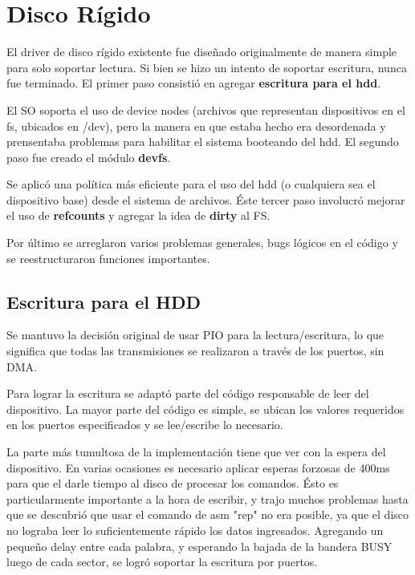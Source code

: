 \section{Disco Rígido}

El driver de disco rígido existente fue diseñado originalmente
de manera simple para solo soportar lectura. Si bien se hizo un intento de
soportar escritura, nunca fue terminado. El primer paso consistió en
agregar \textbf{escritura para el hdd}.

El SO soporta el uso de device nodes (archivos que representan dispositivos en
el fs, ubicados en /dev), pero la manera en que estaba hecho era desordenada y
prensentaba problemas para habilitar el sistema booteando del hdd. El segundo
paso fue creado el módulo \textbf{devfs}.

Se aplicó una política más eficiente para el uso del hdd (o cualquiera sea el
dispositivo base) desde el sistema de archivos. Éste tercer paso involucró
mejorar el uso de \textbf{refcounts} y agregar la idea de \textbf{dirty} al FS.

Por último se arreglaron varios problemas generales, bugs lógicos en el código y
se reestructuraron funciones importantes.

\subsection{Escritura para el HDD}

Se mantuvo la decisión original de usar PIO para la lectura/escritura, lo que
significa que todas las transmisiones se realizaron a través de los puertos, sin
DMA.

Para lograr la escritura se adaptó parte del código responsable de leer del
dispositivo. La mayor parte del código es simple, se ubican los valores
requeridos en los puertos especificados y se lee/escribe lo necesario.

La parte más tumultosa de la implementación tiene que ver con la espera del
dispositivo. En varias ocasiones es necesario aplicar esperas forzosas de 400ms
para que el darle tiempo al disco de procesar los comandos. Ésto es
particularmente importante a la hora de escribir, y trajo muchos problemas hasta
que se descubrió que usar el comando de asm "rep" no era posible, ya que el
disco no lograba leer lo suficientemente rápido los datos ingresados. Agregando
un pequeño delay entre cada palabra, y esperando la bajada de la bandera BUSY
luego de cada sector, se logró soportar la escritura por puertos.

